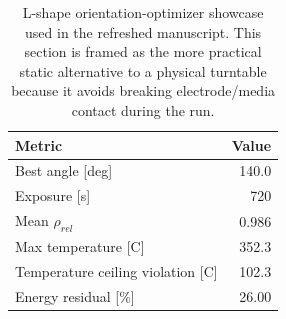 \begin{table}[tb]
\centering
\caption{L-shape orientation-optimizer showcase used in the refreshed manuscript. This section is framed as the more practical static alternative to a physical turntable because it avoids breaking electrode/media contact during the run.}
\label{tab:orientation_refresh}
\small
\begin{tabular}{lr}
\toprule
Metric & Value \\
\midrule
Best angle [deg] & 140.0 \\
Exposure [s] & 720 \\
Mean $\rho_{rel}$ & 0.986 \\
Max temperature [C] & 352.3 \\
Temperature ceiling violation [C] & 102.3 \\
Energy residual [\%] & 26.00 \\
\bottomrule
\end{tabular}
\end{table}
